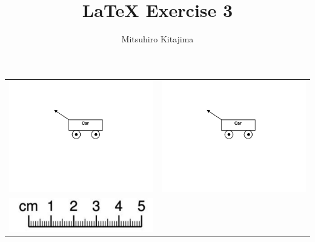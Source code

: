 \documentclass[11pt]{article}
\title{LaTeX Exercise 3}
\author{Mitsuhiro Kitajima}
\begin{document}
    \maketitle

    \begin{tabular}{cc}
        \includegraphics[scale=0.3]{car}  & \includegraphics[scale=0.3, angle=45]{car} \\
        \includegraphics[scale=0.2]{ruler} &
    \end{tabular}
\end{document}

